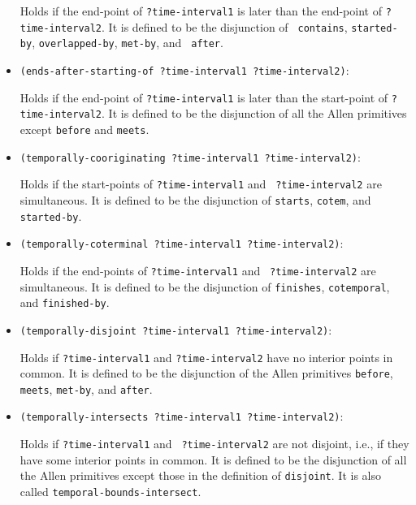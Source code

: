 \begin{itemize}
 Holds if the end-point of {\tt ?time-interval1} is later than the end-point
 of {\tt ?time-interval2}.  It is defined to be the disjunction of {\tt
 contains}, {\tt started-by}, {\tt overlapped-by}, {\tt met-by}, and {\tt
 after}.

\item{\verb'(ends-after-starting-of ?time-interval1 ?time-interval2)':}

 Holds if the end-point of  {\tt ?time-interval1} is later than the start-point
 of {\tt ?time-interval2}.  It is defined to be the disjunction of all the
 Allen primitives except  {\tt before} and {\tt meets}.

\item{\verb'(temporally-cooriginating ?time-interval1 ?time-interval2)':}

 Holds if the start-points of  {\tt ?time-interval1} and {\tt
 ?time-interval2} are simultaneous.  It is defined to be the disjunction of
 {\tt starts}, {\tt cotem}, and {\tt started-by}.

\item{\verb'(temporally-coterminal ?time-interval1 ?time-interval2)':}

 Holds if the end-points of  {\tt ?time-interval1} and {\tt
 ?time-interval2} are simultaneous.  It is defined to be the disjunction of
 {\tt finishes}, {\tt cotemporal}, and {\tt finished-by}.

\item{\verb'(temporally-disjoint ?time-interval1 ?time-interval2)':}

 Holds if {\tt ?time-interval1} and {\tt ?time-interval2} have no interior
 points in common.  It is defined to be the disjunction of the Allen
 primitives {\tt before}, {\tt meets}, {\tt met-by}, and  {\tt after}.

\item{\verb'(temporally-intersects ?time-interval1 ?time-interval2)':}

 Holds if  {\tt ?time-interval1} and {\tt
 ?time-interval2} are not disjoint, i.e., if they have some interior points
 in common.  It is defined to be the disjunction of
 all the Allen primitives except those in the definition of {\tt disjoint}.
 It is also called {\tt temporal-bounds-intersect}.


\end{itemize}

